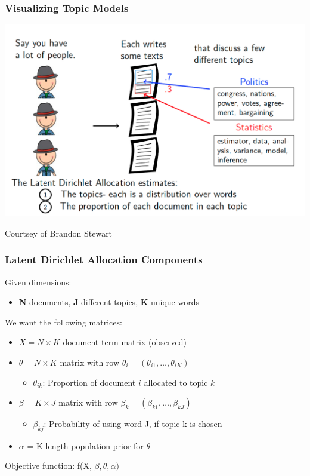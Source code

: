 \documentclass[11pt,compress,professionalfonts]{beamer}
\newcommand{\ita}{\begin{itemize}}
\newcommand{\itz}{\end{itemize}}
\begin{document}
\begin{frame}[t,fragile]\frametitle{Visualizing Topic Models}
\centerline{\includegraphics[scale=.27]{pictures/ldavis.png}}
\centerline{\normalsize Courtsey of Brandon Stewart}
\end{frame}


\begin{frame}[t,fragile]\frametitle{Latent Dirichlet Allocation Components}
Given dimensions:
\ita
\item \textbf{N} documents, \textbf{J} different topics, \textbf{K} unique words
\itz
We want the following matrices:
\ita
\item $X = N \times K$ document-term matrix (observed)
\item $\theta = N \times K$ matrix with row $\theta_i = (\theta_{i1},\ldots,\theta_{iK})$
  \ita
  \item $\theta_{ik}$: Proportion of document $i$ allocated to topic $k$
  \itz
\item $\beta = K \times J$ matrix with row $\beta_k = (\beta_{k1}, \ldots, \beta_{kJ})$
  \ita
  \item $\beta_{kj}$: Probability of using word J, if topic k is chosen
  \itz
\item $\alpha$ = K length population prior for $\theta$
\itz
Objective function: f(X, $\beta, \theta, \alpha)$
\end{frame}
\end{document}
